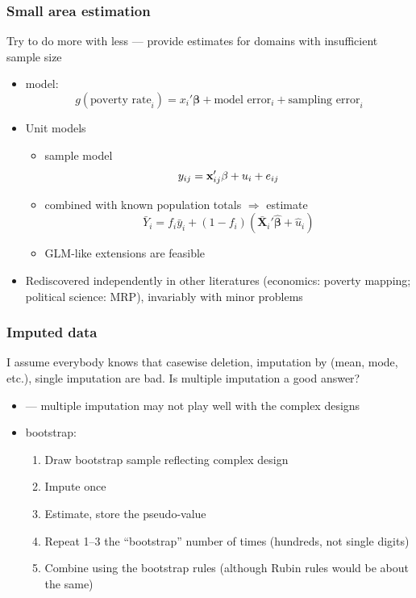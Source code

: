 \documentclass{beamer}
\begin{document}
\begin{frame}\frametitle{Small area estimation}

Try to do more with less --- provide estimates for domains with insufficient sample size

\begin{itemize}
    \item \citet{fay:herriot:1979} model:
        $$
            g(\mbox{poverty rate}_i) = x_i'\mathbf{\beta} + \mbox{model error}_i + \mbox{sampling error}_i
        $$
    \item Unit models \citep{rao:molina:2015}
    \begin{itemize}
        \item sample model
            $$
                y_{ij} = {\bf x}_{ij}' \mathbf{\beta} + u_i + e_{ij}
            $$
        \item combined with known population totals $\Rightarrow$ estimate
            $$
                \bar Y_i = f_i \bar y_i + (1-f_i) (\bar {\mathbf X}_i ' \hat{\mathbf{\beta}} + \hat u_i)
            $$
        \item GLM-like extensions are feasible
    \end{itemize}
    \item Rediscovered independently in other literatures (economics: poverty mapping; political science: MRP),
        invariably with minor problems \citep{molina:rao:2010}
\end{itemize}

\end{frame}

\begin{frame}\frametitle{Imputed data}

I assume everybody knows that casewise deletion, imputation by (mean, mode, etc.), single imputation
are bad. Is multiple imputation \citep{rubin:1996} a good answer?

\begin{itemize}
    \item \citet{kim:brick:fuller:kalton:2006} --- multiple imputation may not play well with the complex designs
    \item \citet{shao:sitter:1996} bootstrap:
        \begin{enumerate}
            \item Draw bootstrap sample reflecting complex design
            \item Impute once
            \item Estimate, store the pseudo-value
            \item Repeat 1--3 the ``bootstrap'' number of times (hundreds, not single digits)
            \item Combine using the bootstrap rules (although Rubin rules would be about the same)
        \end{enumerate}
\end{itemize}

\end{frame}
\end{document}
